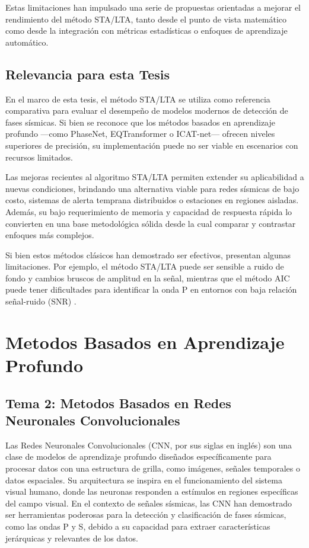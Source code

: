 Estas limitaciones han impulsado una serie de propuestas orientadas a mejorar el rendimiento del método STA/LTA, tanto desde el punto de vista matemático como desde la integración con métricas estadísticas o enfoques de aprendizaje automático.

\subsection{Relevancia para esta Tesis}

En el marco de esta tesis, el método STA/LTA se utiliza como referencia comparativa para evaluar el desempeño de modelos modernos de detección de fases sísmicas. Si bien se reconoce que los métodos basados en aprendizaje profundo —como PhaseNet, EQTransformer o ICAT-net— ofrecen niveles superiores de precisión, su implementación puede no ser viable en escenarios con recursos limitados.

Las mejoras recientes al algoritmo STA/LTA permiten extender su aplicabilidad a nuevas condiciones, brindando una alternativa viable para redes sísmicas de bajo costo, sistemas de alerta temprana distribuidos o estaciones en regiones aisladas. Además, su bajo requerimiento de memoria y capacidad de respuesta rápida lo convierten en una base metodológica sólida desde la cual comparar y contrastar enfoques más complejos.

Si bien estos métodos clásicos han demostrado ser efectivos, presentan algunas limitaciones. Por ejemplo, el método STA/LTA puede ser sensible a ruido de fondo y cambios bruscos de amplitud en la señal, mientras que el método AIC puede tener dificultades para identificar la onda P en entornos con baja relación señal-ruido (SNR) \cite{kalkan2016automatic}\cite{shang2018enhancing}.


\section{Metodos Basados en Aprendizaje Profundo}

\subsection{Tema 2: Metodos Basados en Redes Neuronales Convolucionales}

Las Redes Neuronales Convolucionales (CNN, por sus siglas en inglés) son una clase de modelos de aprendizaje profundo diseñados específicamente para procesar datos con una estructura de grilla, como imágenes, señales temporales o datos espaciales. Su arquitectura se inspira en el funcionamiento del sistema visual humano, donde las neuronas responden a estímulos en regiones específicas del campo visual. En el contexto de señales sísmicas, las CNN han demostrado ser herramientas poderosas para la detección y clasificación de fases sísmicas, como las ondas P y S, debido a su capacidad para extraer características jerárquicas y relevantes de los datos.

